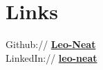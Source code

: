 \documentclass[letterpaper]{deedy-resume} %
\begin{document}
\begin{minipage}[t]{0.30\textwidth}
\sectionspace %


\section{Links} 

Github:// \href{https://github.com/Leo-Neat}{\bf Leo-Neat} \\
LinkedIn:// \href{https://www.linkedin.com/in/leo-neat-82b34b130/}{\bf leo-neat} \\

\sectionspace %

\end{minipage} %
\hfill
%
%
\end{document}
